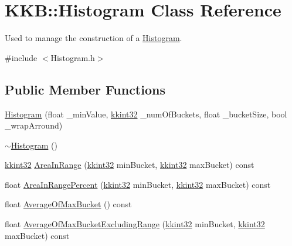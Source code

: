\hypertarget{class_k_k_b_1_1_histogram}{}\section{K\+KB\+:\+:Histogram Class Reference}
\label{class_k_k_b_1_1_histogram}


Used to manage the construction of a \hyperlink{class_k_k_b_1_1_histogram}{Histogram}.  




{\ttfamily \#include $<$Histogram.\+h$>$}

\subsection*{Public Member Functions}
\begin{DoxyCompactItemize}
\item 
\hyperlink{class_k_k_b_1_1_histogram_a9966e27fdb984bcdb227b29514a54021}{Histogram} (float \+\_\+min\+Value, \hyperlink{namespace_k_k_b_a8fa4952cc84fda1de4bec1fbdd8d5b1b}{kkint32} \+\_\+num\+Of\+Buckets, float \+\_\+bucket\+Size, bool \+\_\+wrap\+Arround)
\item 
\hyperlink{class_k_k_b_1_1_histogram_aaf22daf3b8e3f0578337109005532f51}{$\sim$\+Histogram} ()
\item 
\hyperlink{namespace_k_k_b_a8fa4952cc84fda1de4bec1fbdd8d5b1b}{kkint32} \hyperlink{class_k_k_b_1_1_histogram_a62a30cf5745986061d275b25a616f31a}{Area\+In\+Range} (\hyperlink{namespace_k_k_b_a8fa4952cc84fda1de4bec1fbdd8d5b1b}{kkint32} min\+Bucket, \hyperlink{namespace_k_k_b_a8fa4952cc84fda1de4bec1fbdd8d5b1b}{kkint32} max\+Bucket) const 
\item 
float \hyperlink{class_k_k_b_1_1_histogram_a1c6f72547f45e51374e4763b8a15e040}{Area\+In\+Range\+Percent} (\hyperlink{namespace_k_k_b_a8fa4952cc84fda1de4bec1fbdd8d5b1b}{kkint32} min\+Bucket, \hyperlink{namespace_k_k_b_a8fa4952cc84fda1de4bec1fbdd8d5b1b}{kkint32} max\+Bucket) const 
\item 
float \hyperlink{class_k_k_b_1_1_histogram_aa67733d2af3248d68a1ee113ea5d7701}{Average\+Of\+Max\+Bucket} () const 
\item 
float \hyperlink{class_k_k_b_1_1_histogram_aa4191d4ca38d7b7d881038baf4554ded}{Average\+Of\+Max\+Bucket\+Excluding\+Range} (\hyperlink{namespace_k_k_b_a8fa4952cc84fda1de4bec1fbdd8d5b1b}{kkint32} min\+Bucket, \hyperlink{namespace_k_k_b_a8fa4952cc84fda1de4bec1fbdd8d5b1b}{kkint32} max\+Bucket) const 
\item 

\end{DoxyCompactItemize}
